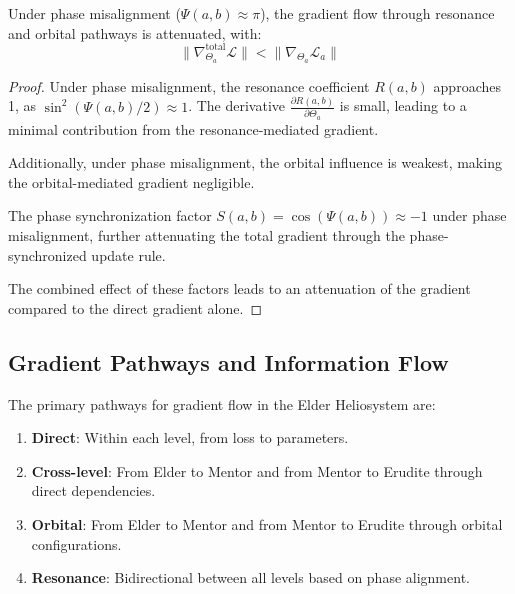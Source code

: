 \begin{theorem}
Under phase misalignment ($\Psi(a, b) \approx \pi$), the gradient flow through resonance and orbital pathways is attenuated, with:
\begin{equation}
\|\nabla_{\Theta_a}^{\text{total}} \mathcal{L}\| < \|\nabla_{\Theta_a} \mathcal{L}_a\|
\end{equation}
\end{theorem}

\begin{proof}
Under phase misalignment, the resonance coefficient $R(a, b)$ approaches 1, as $\sin^2(\Psi(a, b)/2) \approx 1$. The derivative $\frac{\partial R(a, b)}{\partial \Theta_a}$ is small, leading to a minimal contribution from the resonance-mediated gradient.

Additionally, under phase misalignment, the orbital influence is weakest, making the orbital-mediated gradient negligible.

The phase synchronization factor $S(a, b) = \cos(\Psi(a, b)) \approx -1$ under phase misalignment, further attenuating the total gradient through the phase-synchronized update rule.

The combined effect of these factors leads to an attenuation of the gradient compared to the direct gradient alone.
\end{proof}

\subsection{Gradient Pathways and Information Flow}

\begin{theorem}
The primary pathways for gradient flow in the Elder Heliosystem are:
\begin{enumerate}
    \item \textbf{Direct}: Within each level, from loss to parameters.
    \item \textbf{Cross-level}: From Elder to Mentor and from Mentor to Erudite through direct dependencies.
    \item \textbf{Orbital}: From Elder to Mentor and from Mentor to Erudite through orbital configurations.
    \item \textbf{Resonance}: Bidirectional between all levels based on phase alignment.
\end{enumerate}
\end{theorem}

